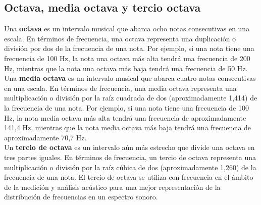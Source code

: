 \documentclass[
	12pt, %
	fleqn, %
	a4paper, %
	oneside, %
]{LegrandOrangeBook}
\begin{document}
\subsection{Octava, media octava y tercio octava}
Una \textbf{octava} es un intervalo musical que abarca ocho notas consecutivas en una escala. En términos de frecuencia, una octava representa una duplicación o división por dos de la frecuencia de una nota. Por ejemplo, si una nota tiene una frecuencia de 100 Hz, la nota una octava más alta tendrá una frecuencia de 200 Hz, mientras que la nota una octava más baja tendrá una frecuencia de 50 Hz.\\
Una \textbf{media octava} es un intervalo musical que abarca cuatro notas consecutivas en una escala. En términos de frecuencia, una media octava representa una multiplicación o división por la raíz cuadrada de dos (aproximadamente 1,414) de la frecuencia de una nota. Por ejemplo, si una nota tiene una frecuencia de 100 Hz, la nota media octava más alta tendrá una frecuencia de aproximadamente 141,4 Hz, mientras que la nota media octava más baja tendrá una frecuencia de aproximadamente 70,7 Hz.\\
Un \textbf{tercio de octava} es un intervalo aún más estrecho que divide una octava en tres partes iguales. En términos de frecuencia, un tercio de octava representa una multiplicación o división por la raíz cúbica de dos (aproximadamente 1,260) de la frecuencia de una nota. El tercio de octava se utiliza con frecuencia en el ámbito de la medición y análisis acústico para una mejor representación de la distribución de frecuencias en un espectro sonoro.
\end{document}
